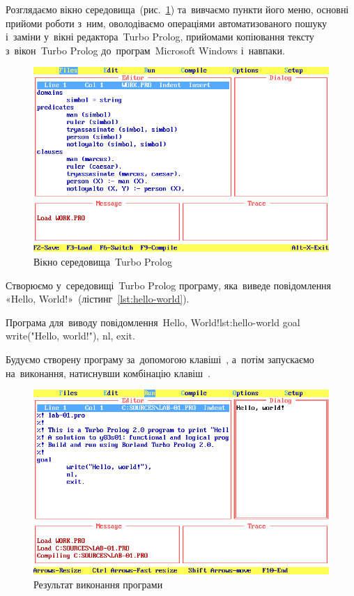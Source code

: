 \documentclass[
	a4paper,
	oneside,
	BCOR = 10mm,
	DIV = 12,
	12pt,
	headings = normal,
]{scrartcl}
\begin{document}
		Розглядаємо вікно середовища~(рис.~\ref{fig:tprolog-win}) та~вивчаємо пункти його меню, основні прийоми роботи з~ним, оволодіваємо операціями автоматизованого пошуку і~заміни у~вікні редактора~\textenglish{Turbo Prolog}, прийомами копіювання тексту з~вікон~\textenglish{Turbo Prolog} до~програм~\textenglish{Microsoft Windows} і~навпаки.
		
		\begin{figure}[!htbp]
			\centering
			\includegraphics[height = 9\baselineskip]{./assets/y03s02-flp-lab-01-p03-neg.png}
			\caption{Вікно середовища~\textenglish{Turbo Prolog}}
			\label{fig:tprolog-win}
		\end{figure}

		Створюємо у~середовищі~\textenglish{Turbo Prolog} програму, яка~виведе повідомлення «\textenglish{Hello, World!}»~(лістинг~\ref{lst:hello-world}).

		\begin{listingprolog}{Програма для~виводу повідомлення~\textenglish{Hello, World!}}{lst:hello-world}
goal
	write("Hello, world!"),
	nl,
	exit.
		\end{listingprolog}

		Будуємо створену програму за~допомогою клавіші~, а~потім запускаємо на~виконання, натиснувши комбінацію клавіш~.

		\begin{figure}[!htbp]
			\centering
			\includegraphics[height = 9\baselineskip]{./assets/y03s02-flp-lab-01-p04-neg.png}
			\caption{Результат виконання програми}
			\label{fig:hello-world-res}
		\end{figure}
\end{document}
